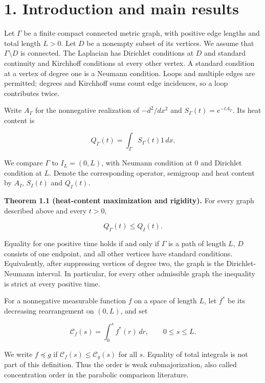 \documentclass[11pt]{article}
\begin{document}
\section{1. Introduction and main
results}\label{introduction-and-main-results}

Let \(\Gamma\) be a finite compact connected metric graph, with positive
edge lengths and total length \(L>0\). Let \(D\) be a nonempty subset of
its vertices. We assume that \(\Gamma\setminus D\) is connected. The
Laplacian has Dirichlet conditions at \(D\) and standard continuity and
Kirchhoff conditions at every other vertex. A standard condition at a
vertex of degree one is a Neumann condition. Loops and multiple edges
are permitted; degrees and Kirchhoff sums count edge incidences, so a
loop contributes twice.

Write \(A_\Gamma\) for the nonnegative realization of \(-d^2/dx^2\) and
\(S_\Gamma(t)=e^{-tA_\Gamma}\). Its heat content is

\[
Q_\Gamma(t)=\int_\Gamma S_\Gamma(t)1\,dx.
\tag{1}
\]

We compare \(\Gamma\) to \(I_L=(0,L)\), with Neumann condition at \(0\)
and Dirichlet condition at \(L\). Denote the corresponding operator,
semigroup and heat content by \(A_I\), \(S_I(t)\) and \(Q_I(t)\).

\textbf{Theorem 1.1 (heat-content maximization and rigidity).} For every
graph described above and every \(t>0\),

\[
Q_\Gamma(t)\le Q_I(t).
\tag{2}
\]

Equality for one positive time holds if and only if \(\Gamma\) is a path
of length \(L\), \(D\) consists of one endpoint, and all other vertices
have standard conditions. Equivalently, after suppressing vertices of
degree two, the graph is the Dirichlet-Neumann interval. In particular,
for every other admissible graph the inequality is strict at every
positive time.

For a nonnegative measurable function \(f\) on a space of length \(L\),
let \(f^*\) be its decreasing rearrangement on \((0,L)\), and set

\[
\mathcal C_f(s)=\int_0^s f^*(r)\,dr,
\qquad 0\le s\le L.
\tag{3}
\]

We write \(f\preccurlyeq g\) if \(\mathcal C_f(s)\le\mathcal C_g(s)\)
for all \(s\). Equality of total integrals is not part of this
definition. Thus the order is weak submajorization, also called
concentration order in the parabolic comparison literature.
\end{document}
